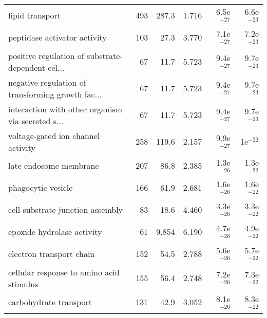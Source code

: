 \begin{longtable}{lrrrrr}
                                   lipid transport &                     493 &                   287.3 &      1.716 &         6.5e$^{-27}$ &         6.6e$^{-23}$ \\
                      peptidase activator activity &                     103 &                    27.3 &      3.770 &         7.1e$^{-27}$ &         7.2e$^{-23}$ \\
 positive regulation of substrate-dependent cel... &                      67 &                    11.7 &      5.723 &         9.4e$^{-27}$ &         9.7e$^{-23}$ \\
 negative regulation of transforming growth fac... &                      67 &                    11.7 &      5.723 &         9.4e$^{-27}$ &         9.7e$^{-23}$ \\
 interaction with other organism via secreted s... &                      67 &                    11.7 &      5.723 &         9.4e$^{-27}$ &         9.7e$^{-23}$ \\
                voltage-gated ion channel activity &                     258 &                   119.6 &      2.157 &         9.9e$^{-27}$ &           1e$^{-22}$ \\
                            late endosome membrane &                     207 &                    86.8 &      2.385 &         1.3e$^{-26}$ &         1.3e$^{-22}$ \\
                                phagocytic vesicle &                     166 &                    61.9 &      2.681 &         1.6e$^{-26}$ &         1.6e$^{-22}$ \\
                  cell-substrate junction assembly &                      83 &                    18.6 &      4.460 &         3.3e$^{-26}$ &         3.3e$^{-22}$ \\
                        epoxide hydrolase activity &                      61 &                   9.854 &      6.190 &         4.7e$^{-26}$ &         4.9e$^{-22}$ \\
                          electron transport chain &                     152 &                    54.5 &      2.788 &         5.6e$^{-26}$ &         5.7e$^{-22}$ \\
          cellular response to amino acid stimulus &                     155 &                    56.4 &      2.748 &         7.2e$^{-26}$ &         7.3e$^{-22}$ \\
                            carbohydrate transport &                     131 &                    42.9 &      3.052 &         8.1e$^{-26}$ &         8.3e$^{-22}$ \\

\end{longtable}
